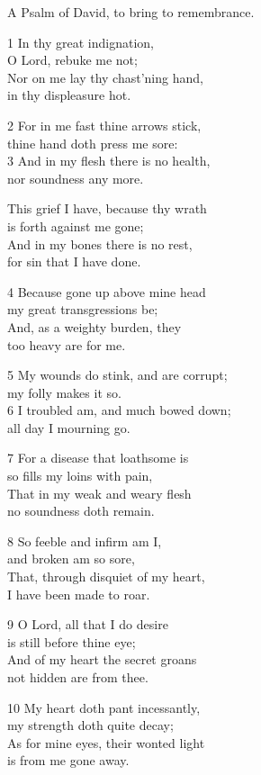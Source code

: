 A Psalm of David, to bring to remembrance.

1 In thy great indignation,\\
O Lord, rebuke me not;\\
Nor on me lay thy chast’ning hand,\\
in thy displeasure hot.

2 For in me fast thine arrows stick,\\
thine hand doth press me sore:\\
3 And in my flesh there is no health,\\
nor soundness any more.

This grief I have, because thy wrath\\
is forth against me gone;\\
And in my bones there is no rest,\\
for sin that I have done.

4 Because gone up above mine head\\
my great transgressions be;\\
And, as a weighty burden, they\\
too heavy are for me.

5 My wounds do stink, and are corrupt;\\
my folly makes it so.\\
6 I troubled am, and much bowed down;\\
all day I mourning go.

7 For a disease that loathsome is\\
so fills my loins with pain,\\
That in my weak and weary flesh\\
no soundness doth remain.

8 So feeble and infirm am I,\\
and broken am so sore,\\
That, through disquiet of my heart,\\
I have been made to roar.

9 O Lord, all that I do desire\\
is still before thine eye;\\
And of my heart the secret groans\\
not hidden are from thee.

10 My heart doth pant incessantly,\\
my strength doth quite decay;\\
As for mine eyes, their wonted light\\
is from me gone away.

